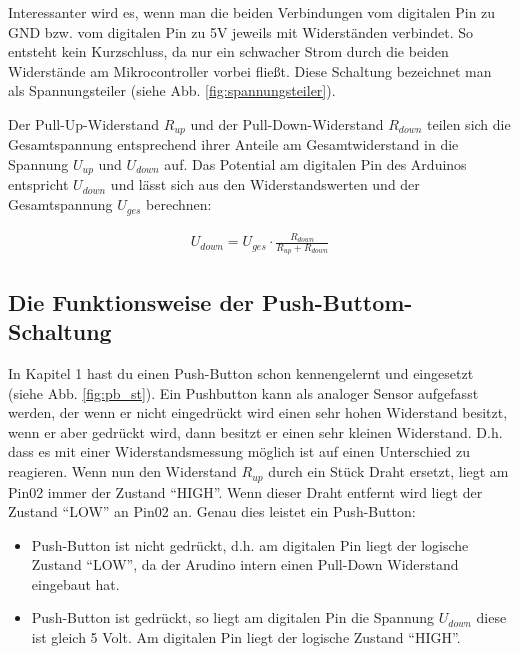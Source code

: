 Interessanter wird es, wenn man die beiden Verbindungen vom digitalen Pin zu GND bzw. vom digitalen Pin zu 5V jeweils mit Widerständen verbindet. So entsteht kein Kurzschluss, da nur ein schwacher Strom durch die beiden Widerstände am Mikrocontroller vorbei fließt. Diese Schaltung bezeichnet man als Spannungsteiler (siehe Abb. \ref{fig:spannungsteiler}).




Der Pull-Up-Widerstand $R_{up}$ und der Pull-Down-Widerstand $R_{down}$ teilen sich die 
Gesamtspannung entsprechend ihrer Anteile am Gesamtwiderstand in die Spannung 
$U_{up}$ und $U_{down}$ auf. Das Potential am digitalen Pin des Arduinos entspricht 
$U_{down}$ und lässt sich aus den Widerstandswerten und der Gesamtspannung $U_{ges}$ berechnen:



\begin{eqnarray}\label{eqn:spannungsteiler}
U_{down} = U_{ges} \cdot \frac{R_{down}}{R_{up} + R_{down}}
\end{eqnarray}

\subsection{Die Funktionsweise der Push-Buttom-Schaltung }
In Kapitel 1 hast du einen Push-Button schon kennengelernt und eingesetzt (siehe Abb. \ref{fig:pb_st}). Ein Pushbutton kann als analoger Sensor aufgefasst werden, der wenn er nicht eingedrückt wird einen sehr hohen Widerstand besitzt, wenn er aber gedrückt wird, dann besitzt er einen sehr kleinen Widerstand. D.h. dass es mit einer Widerstandsmessung möglich ist auf einen Unterschied zu reagieren.  Wenn nun den Widerstand $R_{up}$ durch ein Stück Draht  ersetzt, liegt am Pin02 immer der Zustand ``HIGH''. Wenn dieser Draht entfernt wird liegt der Zustand ``LOW'' an Pin02 an. Genau dies leistet ein Push-Button:


\begin{itemize}
  \item Push-Button ist nicht gedrückt, d.h. am digitalen Pin liegt der logische Zustand ``LOW'', da der Arudino intern einen Pull-Down Widerstand eingebaut hat.
  \item Push-Button ist gedrückt, so liegt am digitalen Pin die Spannung  $U_{down}$ diese ist gleich 5 Volt. Am digitalen Pin liegt der logische Zustand ``HIGH''.
\end{itemize}

